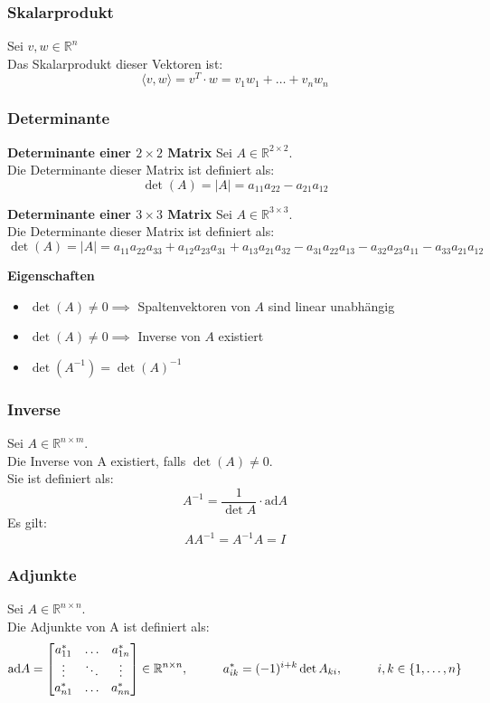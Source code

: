 \documentclass[10pt,a4paper]{article}
\newcommand{\tab}[1][1]{\hspace*{#1cm}}
\begin{document}
\subsubsection{Skalarprodukt}
Sei $v, w \in \mathbb{R}^n$ \\
Das Skalarprodukt dieser Vektoren ist:
$$
\langle v, w \rangle = v^T ⋅ w = v_1w_1 + \dots + v_nw_n
$$

\subsubsection{Determinante}
\textbf{Determinante einer $2 \times 2$ Matrix}
Sei $A \in \mathbb{R}^{2 \times 2}$. \\
Die Determinante dieser Matrix ist definiert als:
$$
	\det(A) = |A| = a_{11}a_{22} - a_{21}a_{12}
$$

\textbf{Determinante einer $3 \times 3$ Matrix}
Sei $A \in \mathbb{R}^{3 \times 3}$. \\
Die Determinante dieser Matrix ist definiert als:
$$
	\det(A) = |A| = a_{11}a_{22}a_{33} + a_{12}a_{23}a_{31} + a_{13}a_{21}a_{32} - a_{31}a_{22}a_{13} - a_{32}a_{23}a_{11} - a_{33}a_{21}a_{12}
$$

\textbf{Eigenschaften}
\begin{itemize}
	\item $\det(A) ≠ 0 \implies$ Spaltenvektoren von $A$ sind linear unabhängig
	\item $\det(A) ≠ 0 \implies$ Inverse von $A$ existiert
	\item $\det(A^{-1}) = \det(A)^{-1}$
\end{itemize}

\subsubsection{Inverse}
Sei $A \in \mathbb{R}^{n \times m}$. \\
Die Inverse von A existiert, falls $\det(A) ≠ 0$. \\
Sie ist definiert als:
$$
	A^{-1} = \frac{1}{\det A} ⋅ \textrm{ad}A
$$
Es gilt:
$$
	AA^{-1} = A^{-1}A = I
$$

\subsubsection{Adjunkte}
Sei $A \in \mathbb{R}^{n \times n}$. \\
Die Adjunkte von A ist definiert als:
$$
	\textrm{ad} A  = \begin{bmatrix}
	a^*_{11} & \dots & a^*_{1n} \\
	\vdots & \ddots & \vdots \\
	a^*_{n1} & \dots & a^*_{nn}
	\end{bmatrix} \in \mathbb{R}^{n \times n}, \tab a^*_{ik} = (-1)^{i + k} \det A_{ki}, \tab i,k \in \{1, \dots, n\}
$$
\end{document}
